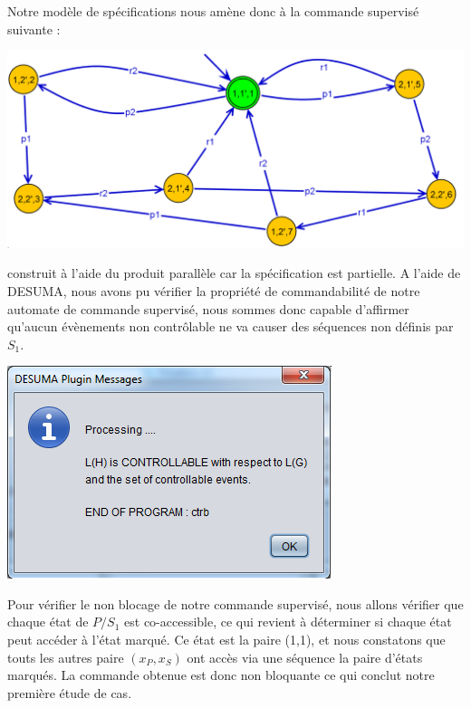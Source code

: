 Notre modèle de spécifications nous amène donc à la commande supervisé suivante :\begin{center}

\includegraphics[scale=0.3]{I/images/P_S1.png}

\end{center}construit à l'aide du produit parallèle car la spécification est partielle.
A l'aide de DESUMA, nous avons pu vérifier la propriété de commandabilité de notre automate de commande supervisé, nous sommes donc capable d'affirmer qu'aucun évènements non contrôlable ne va causer des séquences non définis par $S_1$.
\begin{center}
\includegraphics[scale=0.5]{I/images/P_S1_ctrbl.png}
\end{center}
Pour vérifier le non blocage de notre commande supervisé, nous allons vérifier que chaque état de $P/S_1$ est co-accessible, ce qui revient à déterminer si chaque état peut accéder à l'état marqué. Ce état est la paire (1,1), et nous constatons que touts les autres paire $(x_P,x_S)$ ont accès via une séquence la paire d'états marqués. La commande obtenue est donc non bloquante ce qui conclut notre première étude de cas. 